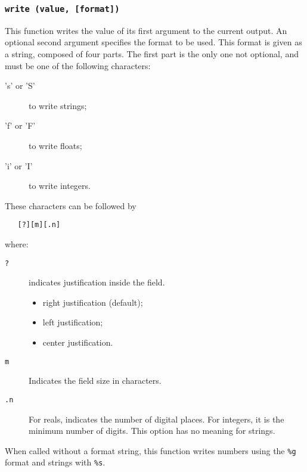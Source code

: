 \subsubsection*{{\tt write (value, [format])}}

This function writes the value of its first argument to the current output.
An optional second argument specifies the format to be used.
This format is given as a string, composed of four parts.
The first part is the only one not optional, and must be one of the
following characters:
\begin{description}
\item['s' or 'S'] to write strings;
\item['f' or 'F'] to write floats;
\item['i' or 'I'] to write integers.
\end{description}
These characters can be followed by
\begin{verbatim}
   [?][m][.n]
\end{verbatim}
where:
\begin{description}
\item[\verb'?'] indicates justification inside the field.
\begin{itemize}
\item['\verb'<''] right justification (default);
\item['\verb'>''] left justification;
\item['\verb'|''] center justification.
\end{itemize}
\item[\verb'm'] Indicates the field size in characters.
\item[\verb'.n'] For reals, indicates the number of digital places.
For integers, it is the minimum number of digits.
This option has no meaning for strings.
\end{description}

When called without a format string,
this function writes numbers using the \verb'%g' format
and strings with \verb'%s'.



